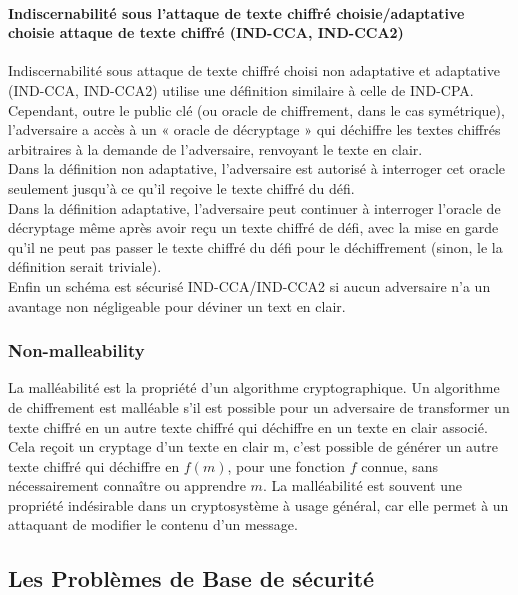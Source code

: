 \documentclass[12pt,openany]{report}
\begin{document}
\paragraph{Indiscernabilité sous l'attaque de texte chiffré choisie/adaptative choisie
attaque de texte chiffré (IND-CCA, IND-CCA2)\\}

Indiscernabilité sous attaque de texte chiffré choisi non adaptative et adaptative (IND-CCA,
IND-CCA2) utilise une définition similaire à celle de IND-CPA. Cependant, outre le public
clé (ou oracle de chiffrement, dans le cas symétrique), l’adversaire a accès à un « oracle de décryptage » qui déchiffre les textes chiffrés arbitraires à la demande de l’adversaire, renvoyant
le texte en clair.\\ Dans la définition non adaptative, l'adversaire est autorisé à interroger cet oracle
seulement jusqu'à ce qu'il reçoive le texte chiffré du défi.\\
 Dans la définition adaptative, l'adversaire
peut continuer à interroger l'oracle de décryptage même après avoir reçu un texte chiffré de défi,
avec la mise en garde qu'il ne peut pas passer le texte chiffré du défi pour le déchiffrement (sinon, le
la définition serait triviale).\\
Enfin un schéma est sécurisé IND-CCA/IND-CCA2 si aucun adversaire n’a un avantage non négligeable pour déviner un text en clair.
\subsubsection{Non-malleability}
La malléabilité est la propriété d'un algorithme cryptographique. Un algorithme de chiffrement est
malléable s'il est possible pour un adversaire de transformer un texte chiffré en un autre texte chiffré
qui déchiffre en un texte en clair associé.\\ Cela reçoit un cryptage d'un texte en clair m, c'est
possible de générer un autre texte chiffré qui déchiffre en $f(m)$, pour une fonction $f$ connue,
sans nécessairement connaître ou apprendre $m$.
La malléabilité est souvent une propriété indésirable dans un cryptosystème à usage général, car elle
permet à un attaquant de modifier le contenu d'un message.


\subsection{Les Problèmes de Base de sécurité}
\end{document}
